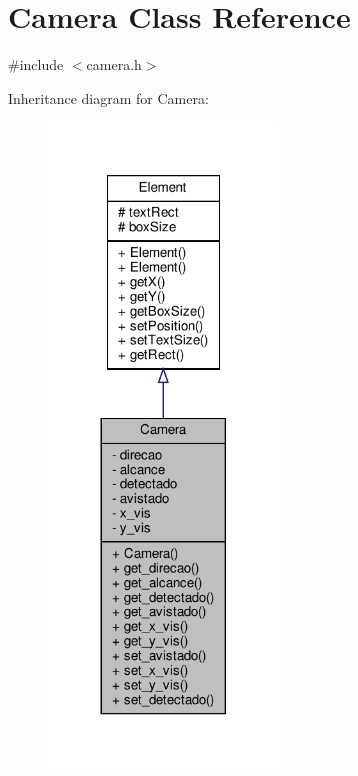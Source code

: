 \hypertarget{classCamera}{}\section{Camera Class Reference}
\label{classCamera}


{\ttfamily \#include $<$camera.\+h$>$}



Inheritance diagram for Camera\+:
\nopagebreak
\begin{figure}[H]
\begin{center}
\leavevmode
\includegraphics[width=173pt]{classCamera__inherit__graph}
\end{center}
\end{figure}


